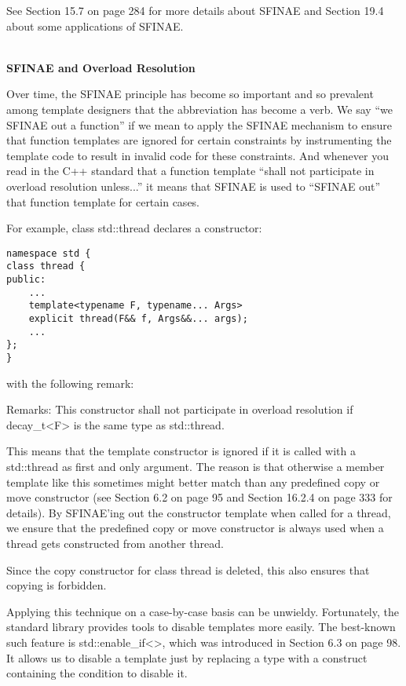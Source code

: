 See Section 15.7 on page 284 for more details about SFINAE and Section 19.4 about some applications of SFINAE.

\hspace*{\fill} \\ %
\noindent
\textbf{SFINAE and Overload Resolution}

Over time, the SFINAE principle has become so important and so prevalent among template designers that the abbreviation has become a verb. We say “we SFINAE out a function” if we mean to apply the SFINAE mechanism to ensure that function templates are ignored for certain constraints by instrumenting the template code to result in invalid code for these constraints. And whenever you read in the C++ standard that a function template “shall not participate in overload resolution unless...” it means that SFINAE is used to “SFINAE out” that function template for certain cases.

For example, class std::thread declares a constructor:

\begin{lstlisting}[style=styleCXX]
namespace std {
class thread {
public:
	...
	template<typename F, typename... Args>
	explicit thread(F&& f, Args&&... args);
	...
};
}
\end{lstlisting}

with the following remark:

Remarks: This constructor shall not participate in overload resolution if decay\_t<F> is the same type as std::thread.

This means that the template constructor is ignored if it is called with a std::thread as first and only argument. The reason is that otherwise a member template like this sometimes might better match than any predefined copy or move constructor (see Section 6.2 on page 95 and Section 16.2.4 on page 333 for details). By SFINAE’ing out the constructor template when called for a thread, we ensure that the predefined copy or move constructor is always used when a thread gets constructed from another thread.

\begin{tcolorbox}[colback=webgreen!5!white,colframe=webgreen!75!black]
\hspace*{0.75cm}Since the copy constructor for class thread is deleted, this also ensures that copying is forbidden.
\end{tcolorbox}

Applying this technique on a case-by-case basis can be unwieldy. Fortunately, the standard library provides tools to disable templates more easily. The best-known such feature is std::enable\_if<>, which was introduced in Section 6.3 on page 98. It allows us to disable a template just by replacing a type with a construct containing the condition to disable it.

